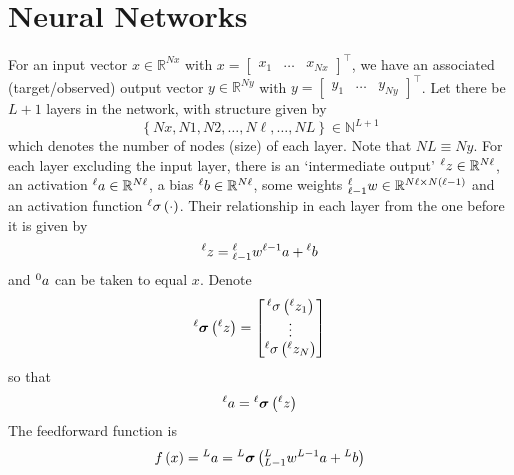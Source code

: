 \documentclass[11pt]{report} %
\begin{document}
\section{Neural Networks}
For an input vector $x\in\mathbb{R}^{Nx}$ with $x=\begin{bmatrix}x_{1} & \dots & x_{Nx}\end{bmatrix}^{\top}$, we have an associated (target/observed) output vector $y\in\mathbb{R}^{Ny}$ with $y=\begin{bmatrix}y_{1} & \dots & y_{Ny}\end{bmatrix}^{\top}$. Let there be $L + 1$ layers in the network, with structure given by
\begin{equation}
\left\{Nx,N1,N2,\dots,N\ell,\dots,NL\right\} \in \mathbb{N}^{L + 1}
\end{equation}
which denotes the number of nodes (size) of each layer. Note that $NL\equiv Ny$. For each layer excluding the input layer, there is an `intermediate output' $\mathstrut^{\ell}z\in\mathbb{R}^{N\ell}$, an activation $\mathstrut^{\ell}a\in\mathbb{R}^{N\ell}$, a bias $\mathstrut^{\ell}b\in\mathbb{R}^{N\ell}$, some weights $\mathstrut_{\ell-1}^{\ell}w\in\mathbb{R}^{N\ell\times N\left(\ell-1\right)}$ and an activation function $\mathstrut^{\ell}\sigma\left(\cdot\right)$. Their relationship in each layer from the one before it is given by
\begin{equation}
\mathstrut^{\ell}z=\mathstrut_{\ell-1}^{\ell}w\mathstrut^{\ell-1}a+\mathstrut^{\ell}b
\end{equation}
and $\mathstrut^{0}a$ can be taken to equal $x$. Denote
\begin{equation}
\mathstrut^{\ell}\boldsymbol{\sigma}\left(\mathstrut^{\ell}z\right)=\begin{bmatrix}\mathstrut^{\ell}\sigma\left(\mathstrut^{\ell} z_{1}\right)\\
\vdots\\
\mathstrut^{\ell}\sigma\left(\mathstrut^{\ell}z_{N}\right)
\end{bmatrix}
\end{equation}
so that
\begin{equation}
\mathstrut^{\ell}a=\mathstrut^{\ell}\boldsymbol{\sigma}\left(\mathstrut^{\ell}z\right)
\end{equation}
The feedforward function is
\begin{equation}
f\left(x\right)=\mathstrut^{L}a=\mathstrut^{L}\boldsymbol{\sigma}\left(\mathstrut_{L-1}^{L}w\mathstrut^{L-1}a+\mathstrut^{L}b\right)
\end{equation}
\end{document}
